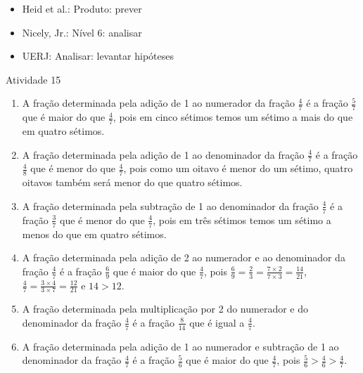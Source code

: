 \begin{multicols}{2}
  
   \vspace{.1cm}
  
 \vspace{.1cm}
   
\begin{itemize} %
    \item       Heid et al.: Produto: prever
    \item       Nicely, Jr.: Nível 6: analisar
    \item       UERJ: Analisar: levantar hipóteses
\end{itemize} %

\begin{resposta*}{Atividade 15}
\begin{enumerate} [\quad a)] %
    \item       A fração determinada pela adição de 1 ao numerador da fração     
  $\frac{4}{7}$       é a fração       $\frac{5}{7}$       que é maior do que    
   $\frac{4}{7}$, pois em cinco sétimos temos um sétimo a mais do que em quatro 
sétimos.
    \item       A fração determinada pela adição de 1 ao denominador da fração   
    $\frac{4}{7}$       é a fração       $\frac{4}{8}$       que é menor do que  
     $\frac{4}{7}$, pois como um oitavo é menor do um sétimo, quatro oitavos 
também será menor do que quatro sétimos.
    \item       A fração determinada pela subtração de 1 ao denominador da 
fração       $\frac{4}{7}$       é a fração       $\frac{3}{7}$       que é 
menor do que       $\frac{4}{7}$, pois em três sétimos temos um sétimo a menos 
do que em quatro sétimos.
    \item       A fração determinada pela adição de 2 ao numerador e ao 
denominador da fração       $\frac{4}{7}$       é a fração       $\frac{6}{9}$   
    que é maior do que       $\frac{4}{7}$, pois       $\frac{6}{9} = 
\frac{2}{3} = \frac{7 \times 2}{7 \times 3} = \frac{14}{21}$,       $\frac{4}{7} 
= \frac{3 \times 4}{3 \times 7} = \frac{12}{21}$       e       $14 > 12$.
    \item       A fração determinada pela multiplicação por 2 do numerador e do 
denominador da fração       $\frac{4}{7}$       é a fração       $\frac{8}{14}$  
     que é igual a       $\frac{4}{7}$.
    \item       A fração determinada pela adição de 1 ao numerador e subtração 
de 1 ao denominador da fração       $\frac{4}{7}$       é a fração       
$\frac{5}{6}$       que é maior do que       $\frac{4}{7}$, pois       
$\frac{5}{6} > \frac{4}{6} > \frac{4}{7}$.
\end{enumerate} %
  

\end{resposta*}
\end{multicols}
